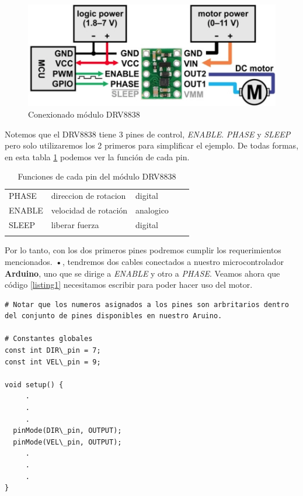 \begin{figure}[h]
    \centering
    \includegraphics[width=0.65\linewidth]{drv8838.png}
    \caption{Conexionado módulo DRV8838}
    \label{drv8838}
\end{figure}

Notemos que el DRV8838 tiene 3 pines de control, \textit{ENABLE}. \textit{PHASE} y \textit{SLEEP} pero solo utilizaremos los 2 primeros para simplificar el ejemplo. De todas formas, en esta tabla \ref{funciones_pin_drv8838} podemos ver la función de cada pin.


\begin{table}[h]
\centering
\begin{tabular}{lllll}
\cline{1-3}
\multicolumn{1}{|l|}{PHASE}  & \multicolumn{1}{l|}{direccion de rotacion} & \multicolumn{1}{l|}{digital}   &  &  \\ \cline{1-3}
\multicolumn{1}{|l|}{ENABLE} & \multicolumn{1}{l|}{velocidad de rotación} & \multicolumn{1}{l|}{analogico} &  &  \\ \cline{1-3}
\multicolumn{1}{|l|}{SLEEP}  & \multicolumn{1}{l|}{liberar fuerza}        & \multicolumn{1}{l|}{digital}   &  &  \\ \cline{1-3}
                             &                                            &                                &  & 
\end{tabular}
\caption{Funciones de cada pin del módulo DRV8838}
\label{funciones_pin_drv8838}
\end{table}

Por lo tanto, con los dos primeros pines podremos cumplir los requerimientos mencionados. \textbf{•}, tendremos dos cables conectados a nuestro microcontrolador \textbf{Arduino}, uno que se dirige a \textit{ENABLE} y otro a \textit{PHASE}. Veamos ahora que código \ref{listing1} necesitamos escribir para poder hacer uso del motor.

\begin{lstlisting}[caption=Configuración inicial,label={listing1}]
# Notar que los numeros asignados a los pines son arbritarios dentro del conjunto de pines disponibles en nuestro Aruino.

# Constantes globales
const int DIR\_pin = 7;
const int VEL\_pin = 9;

void setup() {
     .
     .
     .
  pinMode(DIR\_pin, OUTPUT);
  pinMode(VEL\_pin, OUTPUT);
     .
     .
     .
}
\end{lstlisting}

